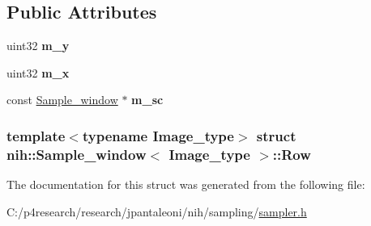 \subsection*{\-Public \-Attributes}
\begin{DoxyCompactItemize}
\item 
\hypertarget{structnih_1_1_sample__window_1_1_row_a90d3646b1784ebf697f0cafe520bb418}{
uint32 {\bfseries m\-\_\-y}}
\label{structnih_1_1_sample__window_1_1_row_a90d3646b1784ebf697f0cafe520bb418}

\item 
\hypertarget{structnih_1_1_sample__window_1_1_row_aa8d8f88071a2cf60e812d3230ccdff28}{
uint32 {\bfseries m\-\_\-x}}
\label{structnih_1_1_sample__window_1_1_row_aa8d8f88071a2cf60e812d3230ccdff28}

\item 
\hypertarget{structnih_1_1_sample__window_1_1_row_af608b835945357afe719acadec9dd620}{
const \hyperlink{classnih_1_1_sample__window}{\-Sample\-\_\-window} $\ast$ {\bfseries m\-\_\-sc}}
\label{structnih_1_1_sample__window_1_1_row_af608b835945357afe719acadec9dd620}

\end{DoxyCompactItemize}
\subsubsection*{template$<$typename Image\-\_\-type$>$ struct nih\-::\-Sample\-\_\-window$<$ Image\-\_\-type $>$\-::\-Row}



\-The documentation for this struct was generated from the following file\-:\begin{DoxyCompactItemize}
\item 
\-C\-:/p4research/research/jpantaleoni/nih/sampling/\hyperlink{sampler_8h}{sampler.\-h}\end{DoxyCompactItemize}

